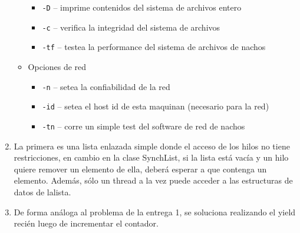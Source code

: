 \documentclass[11pt]{article}
\begin{document}
\begin{enumerate}
\begin{itemize}
\begin{itemize}
                    \item \texttt{-D} -- imprime contenidos del sistema de archivos entero
                    \item \texttt{-c} -- verifica la integridad del sistema de archivos
                    \item \texttt{-tf} -- testea la performance del sistema de archivos de nachos
                \end{itemize}
            \item Opciones de red
                \begin{itemize}
                    \item \texttt{-n} -- setea la confiabilidad de la red
                    \item \texttt{-id} -- setea el host id de esta maquinan (necesario para la red)
                    \item \texttt{-tn} -- corre un simple test del software de red de nachos  
                \end{itemize}
        \end{itemize}

        \addtocounter{enumi}{1} %
        
        \item La primera es una lista enlazada simple donde el acceso de los
              hilos no tiene restricciones, en cambio en la clase SynchList, si la
              lista está vacía y un hilo quiere remover un elemento de ella, deberá
              esperar a que contenga un elemento. Además, sólo un thread a la vez
              puede acceder a las estructuras de datos de lalista.
        \addtocounter{enumi}{3}
        \item De forma análoga al problema de la entrega 1, se soluciona realizando
              el yield recién luego de incrementar el contador.
\end{enumerate}
\end{document}
